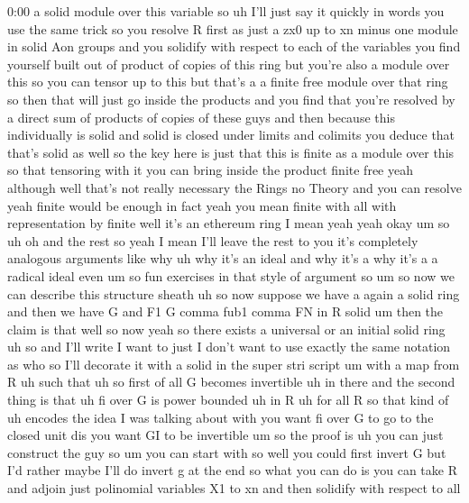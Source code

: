 \begin{unfinished}{0:00}
a  solid  module  over  this
variable
so  uh  I'll  just  say  it  quickly  in  words
you  use  the  same  trick  so  you  resolve  R
first  as  just  a  zx0  up  to  xn  minus  one
module  in  solid  Aon  groups  and  you
solidify  with  respect  to  each  of  the
variables  you  find  yourself  built  out  of
product  of  copies  of  this  ring  but
you're  also  a  module  over  this  so  you
can  tensor  up  to  this  but  that's  a  a
finite  free  module  over  that  ring  so
then  that  will  just  go  inside  the
products  and  you  find  that  you're
resolved  by  a  direct  sum  of  products  of
copies  of  these  guys  and  then  because
this  individually  is  solid  and  solid  is
closed  under  limits  and  colimits  you
deduce  that  that's  solid  as  well  so  the
key  here  is  just  that  this  is  finite  as
a  module  over  this  so  that  tensoring
with  it  you  can  bring  inside  the  product
finite  free  yeah
although  well  that's  not  really
necessary  the  Rings  no  Theory  and  you
can
resolve  yeah  finite  would  be  enough  in
fact
yeah  you  mean  finite  with  all  with
representation  by  finite  well  it's  an
ethereum  ring  I  mean  yeah
yeah  okay
um
so  uh  oh  and  the  rest  so
yeah  I  mean  I'll  leave  the  rest  to  you
it's  completely  analogous  arguments  like
why  uh  why  it's  an  ideal  and  why  it's
a  why  it's  a  a  radical  ideal  even  um  so
fun  exercises  in  that  style  of
argument
so  um  so  now  we  can  describe  this
structure
sheath  uh  so  now  suppose  we  have  a  again
a  solid  ring
and  then  we  have  G  and  F1  G  comma  fub1
comma  FN  in  R
solid
um  then  the  claim  is
that  well  so  now  yeah  so  there  exists  a
universal  or  an
initial
solid
ring
uh
so  and  I'll  write  I  want  to  just  I  don't
want  to  use  exactly  the  same  notation  as
who  so  I'll  decorate  it  with  a  solid  in
the  super  stri  script  um  with  a  map  from
R  uh  such  that  uh  so  first  of  all  G
becomes
invertible  uh  in  there
and  the  second  thing  is  that  uh  fi  over
G  is  power
bounded  uh  in
R  uh  for  all
R  so  that  kind  of  uh  encodes  the  idea  I
was  talking  about  with  you  want  fi  over
G  to  go  to  the  closed  unit  dis  you  want
GI  to  be
invertible  um  so  the  proof
is  uh  you  can  just  construct  the  guy  so
um  you  can  start  with
so  well  you  could  first  invert  G  but  I'd
rather  maybe  I'll  do  invert  g  at  the  end
so  what  you  can  do  is  you  can  take  R  and
adjoin  just  polinomial  variables  X1  to
xn  and  then  solidify  with  respect  to  all

\end{unfinished}
